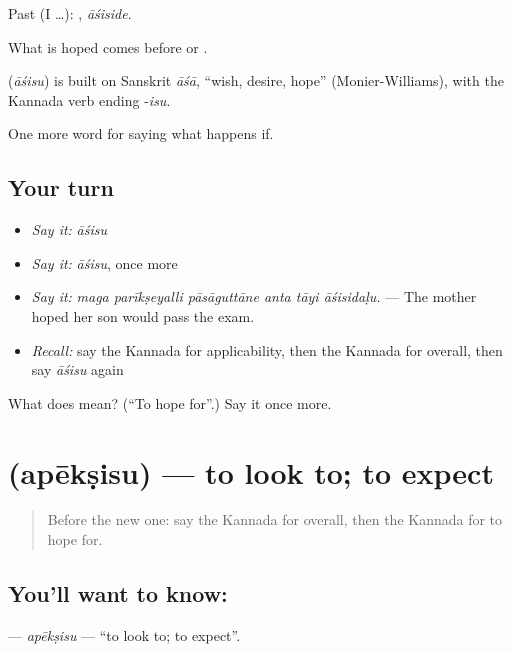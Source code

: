 Past (I …): , \emph{āśiside}.

What is hoped comes before  or .

\begin{cousinweb}
\textbf{} (\emph{āśisu}) is built on Sanskrit \emph{āśā}, \textquotedblleft{}wish, desire, hope\textquotedblright{} (Monier-Williams), with the Kannada verb ending -\emph{isu}.
\end{cousinweb}

\begin{grammarlens}[title={What you've built}]
One more word for saying what happens if.
\end{grammarlens}

\subsection*{Your turn}
\begin{itemize}
\raggedright
  \item \emph{Say it:} \emph{āśisu}
  \item \emph{Say it:} \emph{āśisu}, once more
  \item \emph{Say it:} \emph{maga parīkṣeyalli pāsāguttāne anta tāyi āśisidaḷu.} — The mother hoped her son would pass the exam.
  \item \emph{Recall:} say the Kannada for applicability, then the Kannada for overall, then say \emph{āśisu} again
\end{itemize}

\begin{tcolorbox}[breakable,colback=teal!4,colframe=teal!35!black,title={Before you move on}]
What does  mean? (\textquotedblleft{}To hope for\textquotedblright{}.) Say it once more.
\end{tcolorbox}
\section[\texorpdfstring{\kn{ಅಪೇಕ್ಷಿಸು} (apēkṣisu)}{ಅಪೇಕ್ಷಿಸು (apēkṣisu)}]{ (apēkṣisu) — to look to; to expect}

\label{lesson:KA-C429-apeksisu}



\begin{quote}
Before the new one: say the Kannada for overall, then the Kannada for to hope for.
\end{quote}

\subsection*{You'll want to know: }
\textbf{} — \emph{apēkṣisu} — \textquotedblleft{}to look to; to expect\textquotedblright{}.

